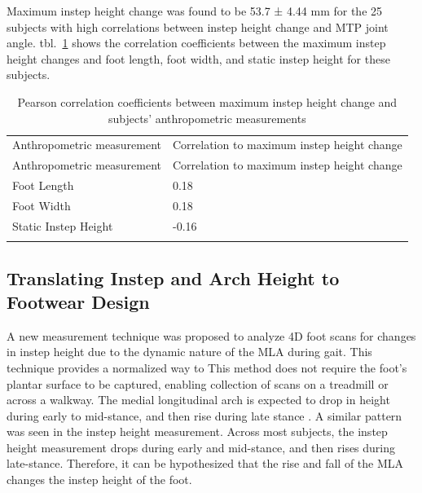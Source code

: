 \documentclass[defaultstyle,11pt]{comps}
\begin{document}
Maximum instep height change was found to be 53.7 ± 4.44 mm for the 25 subjects with high correlations between instep height change and MTP joint angle.
tbl.~\ref{tbl:corrs} shows the correlation coefficients between the maximum instep height changes and foot length, foot width, and static instep height for these subjects.

\hypertarget{tbl:corrs}{}
\begin{longtable}[]{@{}ll@{}}
\caption{\label{tbl:corrs}Pearson correlation coefficients between maximum instep height change and subjects' anthropometric measurements}\tabularnewline
\toprule
Anthropometric measurement & Correlation to maximum instep height change \\ \addlinespace
\midrule
\endfirsthead
\toprule
Anthropometric measurement & Correlation to maximum instep height change \\ \addlinespace
\midrule
\endhead
Foot Length & 0.18 \\ \addlinespace
Foot Width & 0.18 \\ \addlinespace
Static Instep Height & -0.16 \\ \addlinespace
\bottomrule
\end{longtable}

\hypertarget{translating-instep-and-arch-height-to-footwear-design}{%
\subsection{Translating Instep and Arch Height to Footwear Design}\label{translating-instep-and-arch-height-to-footwear-design}}

A new measurement technique was proposed to analyze 4D foot scans for changes in instep height due to the dynamic nature of the MLA during gait.
This technique provides a normalized way to This method does not require the foot's plantar surface to be captured, enabling collection of scans on a treadmill or across a walkway.
The medial longitudinal arch is expected to drop in height during early to mid-stance, and then rise during late stance \citep{Hicks1954, Ker1987, Caravaggi2010, Cashmere1999, Leardini2007, Stolwijk2014, Welte2018, Welte2021}.
A similar pattern was seen in the instep height measurement.
Across most subjects, the instep height measurement drops during early and mid-stance, and then rises during late-stance. Therefore, it can be hypothesized that the rise and fall of the MLA changes the instep height of the foot.
\end{document}
